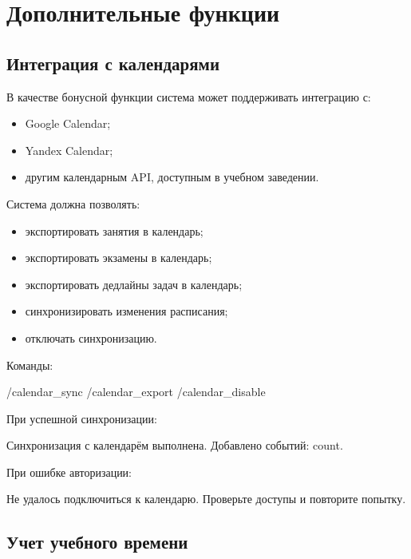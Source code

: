 \documentclass[10pt,a4paper,final]{article} %
\begin{document}
\section{Дополнительные функции}

\subsection{Интеграция с календарями}

В качестве бонусной функции система может поддерживать интеграцию с:

\begin{itemize}
    \item Google Calendar;
    \item Yandex Calendar;
    \item другим календарным API, доступным в учебном заведении.
\end{itemize}

Система должна позволять:

\begin{itemize}
    \item экспортировать занятия в календарь;
    \item экспортировать экзамены в календарь;
    \item экспортировать дедлайны задач в календарь;
    \item синхронизировать изменения расписания;
    \item отключать синхронизацию.
\end{itemize}

Команды:

\begin{Code}
/calendar_sync
/calendar_export
/calendar_disable
\end{Code}

При успешной синхронизации:

\begin{Code}
Синхронизация с календарём выполнена.
Добавлено событий: {count}.
\end{Code}

При ошибке авторизации:

\begin{Code}
Не удалось подключиться к календарю. Проверьте доступы и повторите попытку.
\end{Code}

\subsection{Учет учебного времени}
\end{document}

